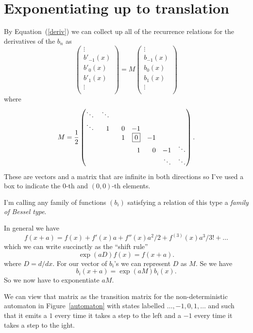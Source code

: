 \documentclass{article}
\begin{document}
\section{Exponentiating up to translation}
By Equation~(\ref{deriv}) we can collect up all of the recurrence relations for the derivatives of the $b_n$ as
\[
\begin{pmatrix}
\vdots \\
b'_{-1}(x) \\
\boxed{b'_0(x)} \\
b'_1(x) \\
\vdots \\
\end{pmatrix}
=
M
\begin{pmatrix}
\vdots \\
b_{-1}(x) \\
\boxed{b_0(x)} \\
b_1(x) \\
\vdots \\
\end{pmatrix}
\]
where
\[
M=\frac{1}{2}
\begin{pmatrix*}[r]
\ddots & \ddots &   &    &   &   &        \\
\ddots & \hphantom{-{}}1 & 0 & -1 &   &   &        \\
       &   & \phantom{-{}}1 & \boxed{0} & -1 &   &        \\
       &   &   & 1 & 0 & -1 & \ddots \\
       &   &   &   &   & \ddots & \ddots \\
\end{pmatrix*}.
\]
These are vectors and a matrix that are infinite in both directions so I've used a box to indicate the $0$-th and $(0,0)$-th elements.

I'm calling any family of functions $(b_i)$ satisfying a relation of this type a \textit{family of Bessel type}.

In general we have
\[
f(x+a) = f(x)+f'(x)a+f''(x)a^2/2+f^{(3)}(x)a^3/3!+\ldots
\]
which we can write succinctly as the ``shift rule''
\[
\exp(aD)f(x) = f(x+a).
\]
where $D=d/dx$.
For our vector of $b_i$'s we can represent $D$ as $M$.
Se we have
\[
b_i(x+a) = \exp(aM)b_i(x).
\]
So we now have to exponentiate $aM$.

We can view that matrix as the transition matrix for the non-deterministic automaton in Figure~\ref{automaton} with states labelled $\ldots, -1, 0, 1, \ldots$ and such that it emits a $1$ every time it takes a step to the left and a $-1$ every time it takes a step to the ight.
\end{document}
